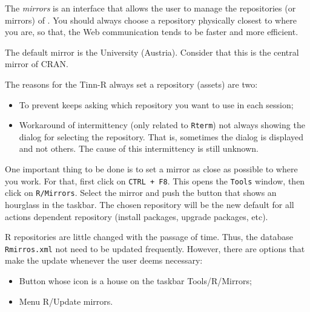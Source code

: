 The \textit{mirrors} is an interface that allows the user to manage the repositories (or mirrors) of \RR{}.
You should always choose a repository physically closest to where you are,
so that, the Web communication tends to be faster and more efficient.

The default mirror is the University 
(Austria).
Consider that this is the central mirror of CRAN.

The reasons for the Tinn-R always set a repository (assets) are two:
\begin{itemize}
   \item To prevent \RR{} keeps asking which repository you want to use in each session;
   \item Workaround of intermittency (only related to \texttt{Rterm}) not always showing the dialog for selecting the repository.
    That is, sometimes the dialog is displayed and not others. The cause of this intermittency is still unknown.
\end{itemize}

One important thing to be done is to set a \RR{} mirror as close as possible to where you work.
For that, first click on \texttt{CTRL + F8}.
This opens the \texttt{Tools} window, then click on \texttt{R/Mirrors}.
Select the \RR{} mirror and push the button that shows an hourglass in the taskbar.
The chosen repository will be the new default for all actions dependent repository
(install packages, upgrade packages, etc).

R repositories are little changed with the passage of time.
Thus, the database \texttt{Rmirros.xml} not need to be updated frequently.
However, there are options that make the update whenever the user deems necessary:
\begin{itemize}
   \item Button whose icon is a house on the taskbar Tools/R/Mirrors;
   \item Menu R/Update mirrors.
\end{itemize}

